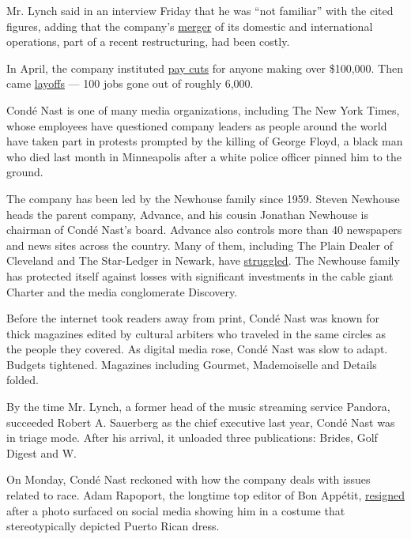 Mr. Lynch said in an interview Friday that he was ``not familiar'' with
the cited figures, adding that the company's
\href{https://www.nytimes3xbfgragh.onion/2018/11/27/business/conde-nast-ceo-robert-sauerberg.html}{merger}
of its domestic and international operations, part of a recent
restructuring, had been costly.

In April, the company instituted
\href{https://www.nytimes3xbfgragh.onion/2020/04/13/business/media/conde-nast-coronavirus-layoffs.html}{pay
cuts} for anyone making over \$100,000. Then came
\href{https://twitter.com/edmundlee/status/1260571924649869313}{layoffs}
--- 100 jobs gone out of roughly 6,000.

Condé Nast is one of many media organizations, including The New York
Times, whose employees have questioned company leaders as people around
the world have taken part in protests prompted by the killing of George
Floyd, a black man who died last month in Minneapolis after a white
police officer pinned him to the ground.

The company has been led by the Newhouse family since 1959. Steven
Newhouse heads the parent company, Advance, and his cousin Jonathan
Newhouse is chairman of Condé Nast's board. Advance also controls more
than 40 newspapers and news sites across the country. Many of them,
including The Plain Dealer of Cleveland and The Star-Ledger in Newark,
have
\href{https://www.nytimes3xbfgragh.onion/2019/05/12/us/new-orleans-advocate-times-picayune.html}{struggled}.
The Newhouse family has protected itself against losses with significant
investments in the cable giant Charter and the media conglomerate
Discovery.

Before the internet took readers away from print, Condé Nast was known
for thick magazines edited by cultural arbiters who traveled in the same
circles as the people they covered. As digital media rose, Condé Nast
was slow to adapt. Budgets tightened. Magazines including Gourmet,
Mademoiselle and Details folded.

By the time Mr. Lynch, a former head of the music streaming service
Pandora, succeeded Robert A. Sauerberg as the chief executive last year,
Condé Nast was in triage mode. After his arrival, it unloaded three
publications: Brides, Golf Digest and W.

On Monday, Condé Nast reckoned with how the company deals with issues
related to race. Adam Rapoport, the longtime top editor of Bon Appétit,
\href{https://www.nytimes3xbfgragh.onion/2020/06/08/dining/bon-appetit-adam-rapoport.html}{resigned}
after a photo surfaced on social media showing him in a costume that
stereotypically depicted Puerto Rican dress.

